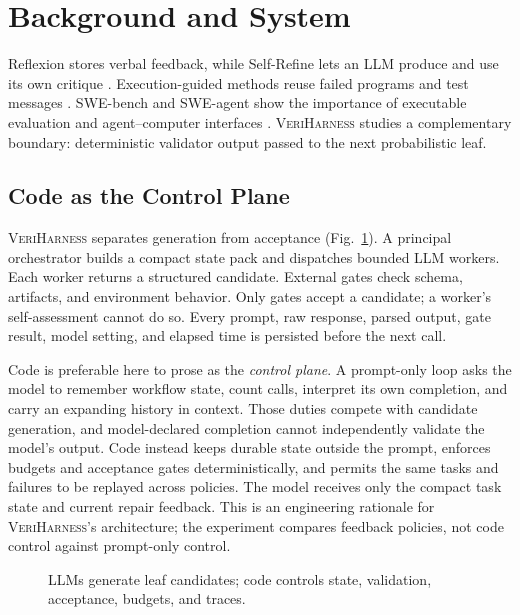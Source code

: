\documentclass[sigconf,review,anonymous]{acmart}
\newcommand{\vh}{\textsc{VeriHarness}\xspace}
\begin{document}
\section{Background and System}

Reflexion stores verbal feedback, while Self-Refine lets an LLM produce and use
its own critique \cite{shinn2023reflexion,madaan2023selfrefine}. Execution-guided
methods reuse failed programs and test messages \cite{chen2024selfdebug}.
SWE-bench and SWE-agent show the importance of executable evaluation and
agent--computer interfaces \cite{jimenez2024swebench,yang2024sweagent}. \vh
studies a complementary boundary: deterministic validator output passed to the
next probabilistic leaf.

\subsection{Code as the Control Plane}

\vh separates generation from acceptance (Fig.~\ref{fig:loop}). A principal
orchestrator builds a compact state pack and dispatches bounded LLM workers.
Each worker returns a structured candidate. External gates check schema,
artifacts, and environment behavior. Only gates accept a candidate; a worker's
self-assessment cannot do so. Every prompt, raw response, parsed output, gate
result, model setting, and elapsed time is persisted before the next call.

Code is preferable here to prose as the \emph{control plane}. A prompt-only
loop asks the model to remember workflow state, count calls, interpret its own
completion, and carry an expanding history in context. Those duties compete
with candidate generation, and model-declared completion cannot independently
validate the model's output. Code instead keeps durable state outside the
prompt, enforces budgets and acceptance gates deterministically, and permits the
same tasks and failures to be replayed across policies. The model receives only
the compact task state and current repair feedback. This is an engineering
rationale for \vh's architecture; the experiment compares feedback policies,
not code control against prompt-only control.

\begin{figure}[t]
\centering
{}
\caption{LLMs generate leaf candidates; code controls state, validation,
acceptance, budgets, and traces.}
\label{fig:loop}
\end{figure}
\end{document}
